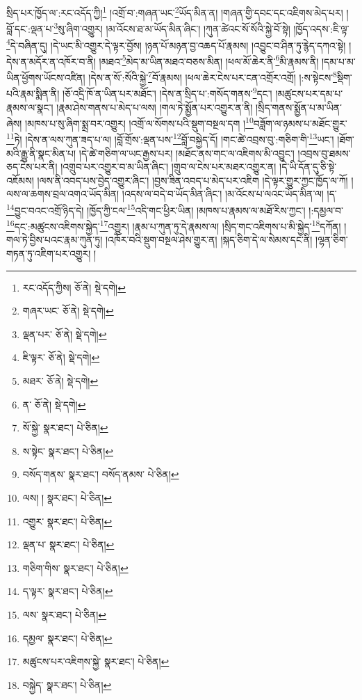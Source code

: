 སྲིད་པར་ཁྱོད་ལ་:རང་འདོད་ཀྱི།\footnote{རང་འདོད་ཀྱིས།  ཅོ་ནེ།  སྡེ་དགེ། } །འགྲོ་བ་:གཞན་ཡང་\footnote{གཞར་ཡང་  ཅོ་ནེ།  སྡེ་དགེ། }ཡོད་མིན་ན། །གཞན་གྱི་དབང་དང་འཇིགས་མེད་པར། །བློ་དང་:ལྡན་པ་\footnote{ལྡན་པར་  ཅོ་ནེ།  སྡེ་དགེ། }སུ་ཞིག་འགྱུར། །མ་འོངས་ཐ་མ་ཡོད་མིན་ཞིང་། །ཀུན་ཚེའང་སོ་སོའི་སྐྱེ་བོ་སྟེ། །ཁྱོད་འདས་:ཇི་ལྟ་\footnote{ཇི་ལྟར་  ཅོ་ནེ།  སྡེ་དགེ། }དེ་བཞིན་དུ། །དེ་ཡང་མི་འགྱུར་དེ་ལྟར་བྱོས། །ཉན་པོ་མཉན་བྱ་འཆད་པོ་རྣམས། །འབྱུང་བ་ཤིན་ཏུ་རྙེད་དཀའ་སྟེ། །དེས་ན་མདོར་ན་འཁོར་བ་ནི། །མཐའ་\footnote{མཐར་  ཅོ་ནེ།  སྡེ་དགེ། }མེད་མ་ཡིན་མཐའ་བཅས་མིན། །ཕལ་མོ་ཆེར་ནི་\footnote{ན་  ཅོ་ནེ།  སྡེ་དགེ། }མི་རྣམས་ནི། །དམ་པ་མ་ཡིན་ཕྱོགས་ཡོངས་འཛིན། །དེས་ན་སོ་:སོའི་སྐྱེ་\footnote{སོ་སྐྱེ་  སྣར་ཐང་།  པེ་ཅིན། }བོ་རྣམས། །ཕལ་ཆེར་ངེས་པར་ངན་འགྲོར་འགྲོ། །:ས་སྟེངས་\footnote{ས་སྟེང་  སྣར་ཐང་།  པེ་ཅིན། }སྡིག་པའི་རྣམ་སྨིན་ནི། །ཅོ་འདྲི་ཁོ་ན་ཡིན་པར་མཐོང་། །དེས་ན་སྲིད་པ་:གསོད་གནས་\footnote{བསོད་གནས་  སྣར་ཐང་། བསོད་ནམས་  པེ་ཅིན། }དང་། །མཚུངས་པར་དམ་པ་རྣམས་ལ་སྣང་། །རྣམ་ཤེས་གནས་པ་མེད་པ་ལས། །གལ་ཏེ་སྨྱོན་པར་འགྱུར་ན་ནི། །སྲིད་གནས་སྨྱོན་པ་མ་ཡིན་ཞེས། །མཁས་པ་སུ་ཞིག་སྨྲ་བར་འགྱུར། །འགྲོ་ལ་སོགས་པའི་སྡུག་བསྔལ་དག །\footnote{ལས། །  སྣར་ཐང་།  པེ་ཅིན། }བཟློག་ལ་ཉམས་པ་མཐོང་གྱུར་\footnote{འགྱུར་  སྣར་ཐང་།  པེ་ཅིན། }ཏེ། །དེས་ན་ལས་ཀུན་ཟད་པ་ལ། །བློ་གྲོས་:ལྡན་པས་\footnote{ལྡན་པ་  སྣར་ཐང་།  པེ་ཅིན། }བློ་བསྐྱེད་དོ། །གང་ཚེ་འབྲས་བུ་:གཅིག་གི་\footnote{གཅིག་གིས་  སྣར་ཐང་།  པེ་ཅིན། }ཡང་། །ཐོག་མའི་རྒྱུ་ནི་སྣང་མིན་པ། །དེ་ཚེ་གཅིག་ལ་ཡང་རྒྱས་པར། །མཐོང་ནས་གང་ལ་འཇིགས་མི་འབྱུང་། །འབྲས་བུ་ཐམས་ཅད་ངེས་པར་ནི། །འགྲུབ་པར་འགྱུར་བ་མ་ཡིན་ཞིང་། །གྲུབ་ལ་ངེས་པར་མཐར་འགྱུར་ན། །དེ་ཡི་དོན་དུ་ཅི་སྟེ་འཇོམས། །ལས་ནི་འབད་པས་བྱེད་འགྱུར་ཞིང་། །བྱས་ཟིན་འབད་པ་མེད་པར་འཇིག །དེ་ལྟར་གྱུར་ཀྱང་ཁྱོད་ལ་ཀོ། །ལས་ལ་ཆགས་བྲལ་འགའ་ཡོད་མིན། །འདས་ལ་བདེ་བ་ཡོད་མིན་ཞིང་། །མ་འོངས་པ་ལའང་ཡོད་མིན་ལ། །ད་\footnote{ད་ལྟར་  སྣར་ཐང་།  པེ་ཅིན། }བྱུང་བའང་འགྲོ་ཉིད་དེ། །ཁྱོད་ཀྱི་ངལ་\footnote{ལས་  སྣར་ཐང་།  པེ་ཅིན། }འདི་གང་ཕྱིར་ཡིན། །མཁས་པ་རྣམས་ལ་མཐོ་རིས་ཀྱང་། །:དམྱལ་བ་\footnote{དམྱལ་  སྣར་ཐང་།  པེ་ཅིན། }དང་:མཚུངས་འཇིགས་སྐྱེད་\footnote{མཚུངས་པར་འཇིགས་སྐྱེ་  སྣར་ཐང་།  པེ་ཅིན། }འགྱུར། །རྣམ་པ་ཀུན་ཏུ་དེ་རྣམས་ལ། །སྲིད་གང་འཇིགས་པ་མི་སྐྱེད་\footnote{བསྐྱེད་  སྣར་ཐང་།  པེ་ཅིན། }དཀོན། །གལ་ཏེ་བྱིས་པའང་རྣམ་ཀུན་ཏུ། །འཁོར་བའི་སྡུག་བསྔལ་ཤེས་གྱུར་ན། །སྐད་ཅིག་དེ་ལ་སེམས་དང་ནི། །ལྷན་ཅིག་གཏན་ཏུ་འཇིག་པར་འགྱུར། །
